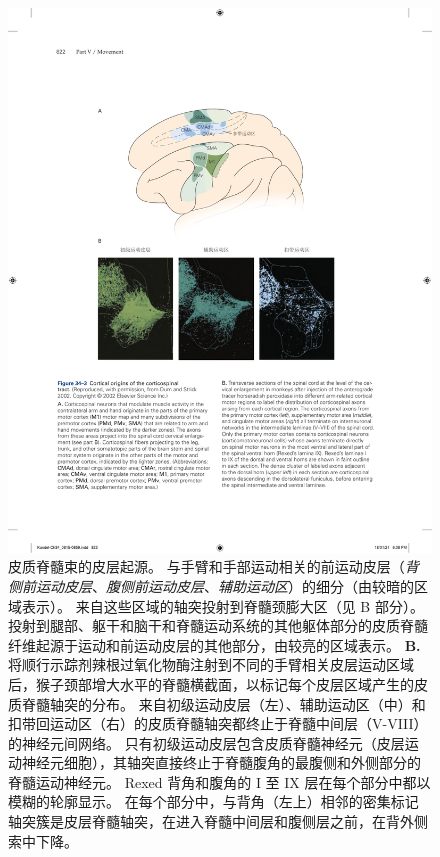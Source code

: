 \begin{figure}[htbp]
	\centering
	\includegraphics[width=0.95\linewidth]{chap34/fig_34_3}
	\caption{皮质脊髓束的皮层起源。 
		与手臂和手部运动相关的前运动皮层（\textit{背侧前运动皮层}、\textit{腹侧前运动皮层}、\textit{辅助运动区}）的细分（由较暗的区域表示）。
		来自这些区域的轴突投射到脊髓颈膨大区（见 B 部分）。
		投射到腿部、躯干和脑干和脊髓运动系统的其他躯体部分的皮质脊髓纤维起源于运动和前运动皮层的其他部分，由较亮的区域表示。 
		\textbf{B.} 将顺行示踪剂辣根过氧化物酶注射到不同的手臂相关皮层运动区域后，猴子颈部增大水平的脊髓横截面，以标记每个皮层区域产生的皮质脊髓轴突的分布。
		来自初级运动皮层（左）、辅助运动区（中）和扣带回运动区（右）的皮质脊髓轴突都终止于脊髓中间层（V-VIII）的神经元间网络。
		只有初级运动皮层包含皮质脊髓神经元（皮层运动神经元细胞），其轴突直接终止于脊髓腹角的最腹侧和外侧部分的脊髓运动神经元。
		Rexed 背角和腹角的 I 至 IX 层在每个部分中都以模糊的轮廓显示。
		在每个部分中，与背角（左上）相邻的密集标记轴突簇是皮层脊髓轴突，在进入脊髓中间层和腹侧层之前，在背外侧索中下降。}
	\label{fig:34_3}
\end{figure}


